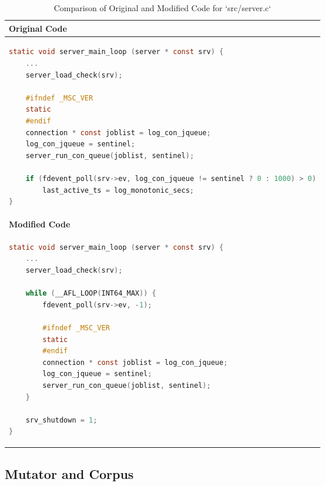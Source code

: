 \begin{table}[H]
\centering
\begin{tabular}{|p{}|}
\hline
\textbf{Original Code} \\
\hline
\begin{lstlisting}[language=c, basicstyle=\footnotesize, breaklines=true]
static void server_main_loop (server * const srv) {
    ...
    server_load_check(srv);

    #ifndef _MSC_VER
    static
    #endif
    connection * const joblist = log_con_jqueue;
    log_con_jqueue = sentinel;
    server_run_con_queue(joblist, sentinel);

    if (fdevent_poll(srv->ev, log_con_jqueue != sentinel ? 0 : 1000) > 0)
        last_active_ts = log_monotonic_secs;
}
\end{lstlisting} \\
\hline
\textbf{Modified Code} \\
\hline
\begin{lstlisting}[language=c, basicstyle=\footnotesize, breaklines=true]
static void server_main_loop (server * const srv) {
    ...
    server_load_check(srv);

    while (__AFL_LOOP(INT64_MAX)) {
        fdevent_poll(srv->ev, -1);
        
        #ifndef _MSC_VER
        static
        #endif
        connection * const joblist = log_con_jqueue;
        log_con_jqueue = sentinel;
        server_run_con_queue(joblist, sentinel);
    }

    srv_shutdown = 1;
}
\end{lstlisting} \\
\hline
\end{tabular}
\caption{Comparison of Original and Modified Code for `src/server.c`}
\label{tab:server_patch}
\end{table}

\subsection{Mutator and Corpus}

